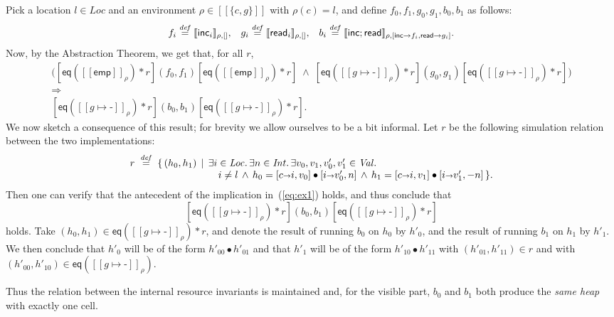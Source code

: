 \documentclass{LMCS}
\newcommand{\blank}{\mbox{-}}
\newcommand{\emp}{\mathsf{emp}}
\newcommand{\pointsto}{\mapsto}
\newcommand{\Loc}{\mathit{Loc}}
\newcommand{\sval}{\mathit{Val}}
\newcommand{\sint}{\mathit{Int}}
\newcommand{\bind}{{\scriptstyle\relax\rightarrow}}
\newcommand{\ff}[1]{[\![#1]\!]}
\newcommand{\squad}[4]{{[{#1}]}
                        ({#2},  {#3})
                       {[{#4}]}}
\newcommand{\EQ}{\mathsf{eq}}
\newcommand{\defeq}{\stackrel{\mathit{def}}{=}}
\newcommand{\inc}{\mathsf{inc}}
\newcommand{\mread}{\mathsf{read}}
\begin{document}
Pick a location $l \in \Loc$ and an environment $\rho \in \ff{\{c,g\}}$ 
with $\rho(c) = l$, and define $f_0,f_1,g_0,g_1,b_0,b_1$ as follows:
$$
f_i \defeq \ff{\inc_i}_{\rho,[]},\;\;\; 
g_i \defeq \ff{\mread_i}_{\rho,[]},\;\;\;
b_i \defeq \ff{\inc;\mread}_{\rho,[\inc\bind f_i, \mread\bind g_i]}.
$$
Now, by the Abstraction Theorem, we get that, for all $r$,
\begin{equation}\label{eq:ex1}
\begin{array}{c}
  \bigl(
    \squad
    {\EQ(\ff{\emp}_\rho)*r}
    {f_0}
    {f_1}
    {\EQ(\ff{\emp}_\rho)*r}
    \;\land\;
    \squad
    {\EQ(\ff{g\pointsto\blank}_\rho)*r}
    {g_0}
    {g_1}
    {\EQ(\ff{g\pointsto\blank}_\rho)*r}\big) 
\\
 {}
 \Rightarrow
 {}
\\
  \squad
    {\EQ(\ff{g\pointsto \blank}_\rho)*r}
    {b_0}
    {b_1}
    {\EQ(\ff{g\pointsto \blank}_\rho)*r}.
\end{array}
\end{equation}
We now sketch a consequence of this result; for brevity we allow ourselves
to be a bit informal. Let $r$ be the following simulation relation
between the two implementations:
$$
  r \;\defeq\; \{\, (h_0,h_1)\,\mid\,
         \begin{array}[t]{@{}l@{}}
         \exists i \in \Loc.\,
         \exists n \in \sint.\,
         \exists v_0,v_1,v_0',v_1' \in \sval.\; \\
         \quad
          i \not= l \,\land\,
          h_0 = [c\bind i,v_0] \bullet [i\bind v_0',n]  \,\land\,
          h_1 = [c\bind i,v_1]\bullet [i\bind v_1',{-}n] \,\}.
        \end{array}
$$
Then one can verify that the antecedent of the implication
in~(\ref{eq:ex1}) holds, and thus conclude that 
$$
  \squad
    {\EQ(\ff{g\pointsto \blank}_\rho)*r}
    {b_0}
    {b_1}
    {\EQ(\ff{g\pointsto \blank}_\rho)*r}
$$
holds.  Take $(h_0,h_1)\in \EQ(\ff{g\pointsto
  \blank}_\rho)*r$, and denote the result of running $b_0$ on
$h_0$ by $h'_0$, and the result of running $b_1$ on $h_1$ by $h'_1$. We
then conclude that $h'_0$ will be of the form $h'_{00}\bullet h'_{01}$ and
that $h'_1$ will be of the form $h'_{10}\bullet h'_{11}$ with
$(h'_{01},h'_{11})\in r$ and with $(h'_{00}, h'_{10})\in\EQ(\ff{g\pointsto
  \blank}_\rho)$.

Thus the relation between the internal resource invariants is
maintained and, for the visible part, $b_0$ and $b_1$ both produce the
\emph{same heap} with exactly one cell.
\end{document}
